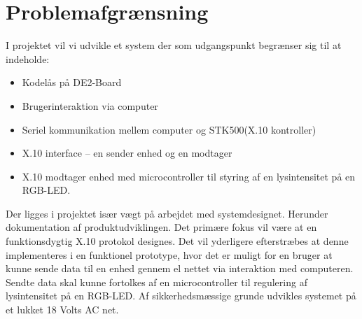 \documentclass[oneside]{memoir}
\begin{document}
\section{Problemafgrænsning}
\begin{flushleft}
I projektet vil vi udvikle et system der som udgangspunkt begrænser sig til at indeholde:
\begin{itemize}
    \item Kodelås på DE2-Board
    \item Brugerinteraktion via computer
    \item Seriel kommunikation mellem computer og STK500(X.10 kontroller) 
    \item X.10 interface – en sender enhed og en modtager 
    \item X.10 modtager enhed med microcontroller til styring af en lysintensitet på en RGB-LED.
\end{itemize}
Der ligges i projektet især vægt på arbejdet med systemdesignet. Herunder dokumentation af produktudviklingen. Det primære fokus vil være at en funktionsdygtig X.10 protokol designes. Det vil yderligere efterstræbes at denne implementeres i en funktionel prototype, hvor det er muligt for en bruger at kunne sende data til en enhed gennem el nettet via interaktion med computeren. Sendte data skal kunne fortolkes af en microcontroller til regulering af lysintensitet på en RGB-LED. 
\newline 
\newline 
Af sikkerhedsmæssige grunde udvikles systemet på et lukket 18 Volts AC net.
\end{flushleft}
\end{document}
